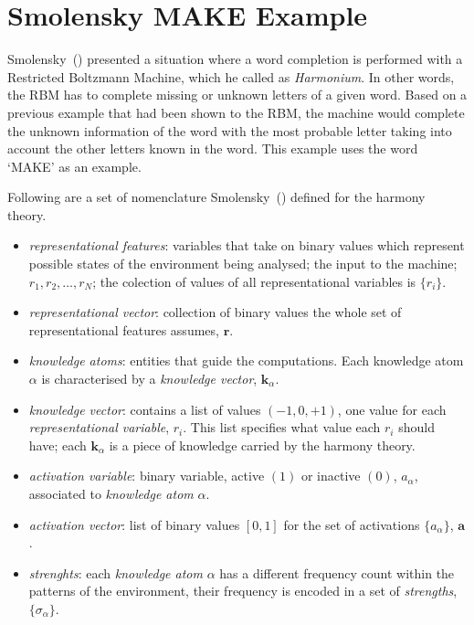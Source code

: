 \section{Smolensky MAKE Example}%
\label{app:smolensky:make}%

Smolensky~(\citeyear{bib:smolensky1986}) presented a situation where a word completion is performed with a Restricted Boltzmann Machine, which he called as \emph{Harmonium}.
In other words, the RBM has to complete missing or unknown letters of a given word. 
Based on a previous example that had been shown to the RBM, the machine would complete the unknown information of the word with the most probable letter taking into account the other letters known in the word. 
This example uses the word `MAKE' as an example. 

Following are a set of nomenclature Smolensky~(\citeyear{bib:smolensky1986}) defined for the harmony theory. 
\begin{itemize}
    \item \emph{representational features}: variables that take on binary values which represent possible states of the environment being analysed; the input to the machine; $r_{1}, r_{2}, \dots, r_{N}$; the colection of values of all representational variables is $\{r_{i}\}$. 
    \item \emph{representational vector}: collection of binary values the whole set of representational features assumes, $\mathbf{r}$. 
    \item \emph{knowledge atoms}: entities that guide the computations. Each knowledge atom $\alpha$ is characterised by a \emph{knowledge vector}, $\mathbf{k}_{\alpha}$. 
    \item \emph{knowledge vector}: contains a list of values $(-1, 0, +1)$, one value for each \emph{representational variable}, $r_{i}$. This list specifies what value each $r_{i}$ should have; each $\mathbf{k}_{\alpha}$ is a piece of knowledge carried by the harmony theory. 
    \item \emph{activation variable}: binary variable, active $(1)$ or inactive $(0)$, $a_{\alpha}$, associated to \emph{knowledge atom} $\alpha$. 
    \item \emph{activation vector}: list of binary values $[0, 1]$ for the set of activations $\{a_{\alpha}\}$, $\mathbf{a}$. 
    \item \emph{strenghts}: each \emph{knowledge atom} $\alpha$ has a different frequency count within the patterns of the environment, their frequency is encoded in a set of \emph{strengths}, $\{\sigma_{\alpha}\}$. 
\end{itemize}

